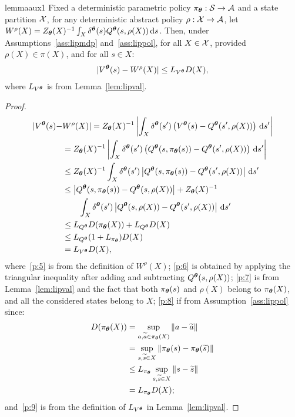 \begin{restatable}{lemma}{aux1}\label{lem:aux1}
	Fixed a deterministic parametric policy $\pi_{\boldsymbol{\theta}}:\mathcal{S}\to\mathcal{A}$ and a state partition $\mathcal{X}$, for any deterministic abstract policy $\rho:\mathcal{X}\to\mathcal{A}$, let $W^{\rho}(X) = Z_{\boldsymbol{\theta}}(X)^{-1}\int_{X}\delta^{\boldsymbol{\theta}}(s)Q^{\boldsymbol{\theta}}(s,\rho(X))\,\mathrm{d} s$. Then, under Assumptions~\ref{ass:lipmdp} and~\ref{ass:lippol}, for all $X\in\mathcal{X}$, provided $\rho(X) \in \pi(X)$, and for all $s\in X$:
	\begin{align*}
	|V^{\boldsymbol{\theta}}(s) - W^{\rho}(X)| \leq L_{V^{\boldsymbol{\theta}}}D(X),
	\end{align*}
	where $L_{V^{\boldsymbol{\theta}}}$ is from Lemma~\ref{lem:lipval}.
\end{restatable}
\begin{proof}
	\begin{align}
	|V^{\boldsymbol{\theta}}(s) - &W^{\rho}(X)| = Z_{\boldsymbol{\theta}}(X)^{-1}\left|\int_{X}\delta^{\boldsymbol{\theta}}(s')\left(V^{\boldsymbol{\theta}}(s) - Q^{\boldsymbol{\theta}}(s',\rho(X))\right)\,\mathrm{d} s'\right| \label{p:5}\\
	&= Z_{\boldsymbol{\theta}}(X)^{-1} \left|\int_{X}\delta^{\boldsymbol{\theta}}(s')\left(Q^{\boldsymbol{\theta}}(s,\pi_{\boldsymbol{\theta}}(s)) - Q^{\boldsymbol{\theta}}(s',\rho(X))\right)\,\mathrm{d} s'\right| \nonumber\\
	&\leq Z_{\boldsymbol{\theta}}(X)^{-1} \int_{X}\delta^{\boldsymbol{\theta}}(s')\left|Q^{\boldsymbol{\theta}}(s,\pi_{\boldsymbol{\theta}}(s)) - Q^{\boldsymbol{\theta}}(s',\rho(X))\right|\,\mathrm{d} s' \nonumber\\
	&\leq \left|Q^{\boldsymbol{\theta}}(s,\pi_{\boldsymbol{\theta}}(s)) - Q^{\boldsymbol{\theta}}(s,\rho(X))\right| + Z_{\boldsymbol{\theta}}(X)^{-1} \nonumber\\ 
	& \qquad \int_{X}\delta^{\boldsymbol{\theta}}(s')\left|Q^{\boldsymbol{\theta}}(s,\rho(X)) - Q^{\boldsymbol{\theta}}(s',\rho(X))\right|\,\mathrm{d} s' \label{p:6}\\
	&\leq L_{Q^{\boldsymbol{\theta}}}D(\pi_{\boldsymbol{\theta}}(X)) +  L_{Q^{\boldsymbol{\theta}}}D(X) \label{p:7}\\
	&\leq L_{Q^{\boldsymbol{\theta}}}(1+L_{\pi_{\boldsymbol{\theta}}})D(X) \label{p:8}\\
	&= L_{V^{\boldsymbol{\theta}}}D(X),\label{p:9}
	\end{align}
	where~\eqref{p:5} is from the definition of $W^{\rho}(X)$; \eqref{p:6} is obtained by applying the triangular inequality after adding and subtracting $Q^{\boldsymbol{\theta}}(s,\rho(X))$; \eqref{p:7} is from Lemma~\ref{lem:lipval} and the fact that both $\pi_{\boldsymbol{\theta}}(s)$ and $\rho(X)$ belong to $\pi_{\boldsymbol{\theta}}(X)$, and all the considered states belong to $X$; \eqref{p:8} if from Assumption~\ref{ass:lippol} since: 
	\begin{align}
	D(\pi_{\boldsymbol{\theta}}(X)) &= \sup_{a,\widetilde{a}\in\pi_{\boldsymbol{\theta}}(X)}\left\|a-\widetilde{a}\right\|_{} \nonumber\\
	&= \sup_{s,\widetilde{s}\in X}\left\|\pi_{\boldsymbol{\theta}}(s)-\pi_{\boldsymbol{\theta}}(\widetilde{s})\right\|_{} \nonumber\\
	&\leq L_{\pi_{\boldsymbol{\theta}}}\sup_{s,\widetilde{s}\in X}\left\|s-\widetilde{s}\right\|_{}\nonumber\\
	& = L_{\pi_{\boldsymbol{\theta}}}D(X);
	\end{align} 
	and~\eqref{p:9} is from the definition of $L_{V^{\boldsymbol{\theta}}}$ in Lemma~\ref{lem:lipval}.
\end{proof}

